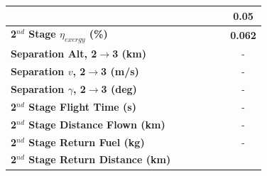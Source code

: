 \begin{table}[ht]
\begin{tabular}{l c c c c c c}
		& \firstsecondSeparationgammamThreeNinety
		& \firstsecondSeparationgammamThreeNinetyFive
		& \firstsecondSeparationgammamThreeStandard
		& \firstsecondSeparationgammamThreeOneHundredFive
		& \firstsecondSeparationgammamThreeOneHundredTen
		&0.05
		\\
		\hline 
		\textbf{2$^{nd}$ Stage $\eta_{exergy}$ (\%)}
		& \textbf{\secondExergyEffmThreeNinety}
		& \textbf{\secondExergyEffmThreeNinetyFive}
		& \textbf{\secondExergyEffmThreeStandard}
		& \textbf{\secondExergyEffmThreeOneHundredFive}
		& \textbf{\secondExergyEffmThreeOneHundredTen}
		& \textbf{0.062}
		\\
		\textbf{Separation Alt, 2$\rightarrow$3 (km)}
		& \secondthirdSeparationAltmThreeNinety
		& \secondthirdSeparationAltmThreeNinetyFive
		& \secondthirdSeparationAltmThreeStandard
		& \secondthirdSeparationAltmThreeOneHundredFive
		& \secondthirdSeparationAltmThreeOneHundredTen
		& -
		\\
		\textbf{Separation $v$, 2$\rightarrow$3 (m/s)}
		& \secondthirdSeparationvmThreeNinety
		& \secondthirdSeparationvmThreeNinetyFive
		& \secondthirdSeparationvmThreeStandard
		& \secondthirdSeparationvmThreeOneHundredFive
		& \secondthirdSeparationvmThreeOneHundredTen
		& -
		\\
		\textbf{Separation $\gamma$, 2$\rightarrow$3 (deg)}
		& \secondthirdSeparationgammamThreeNinety
		& \secondthirdSeparationgammamThreeNinetyFive
		& \secondthirdSeparationgammamThreeStandard
		& \secondthirdSeparationgammamThreeOneHundredFive
		& \secondthirdSeparationgammamThreeOneHundredTen
		& -
		\\
		\textbf{2$^{nd}$ Stage Flight Time (s)}
		& \secondFlightTimemThreeNinety
		& \secondFlightTimemThreeNinetyFive
		& \secondFlightTimemThreeStandard
		& \secondFlightTimemThreeOneHundredFive
		& \secondFlightTimemThreeOneHundredTen
		& -
		\\
		\textbf{2$^{nd}$ Stage Distance Flown (km)}
		& \SecondDistmThreeNinety
		& \SecondDistmThreeNinetyFive
		& \SecondDistmThreeStandard
		& \SecondDistmThreeOneHundredFive
		& \SecondDistmThreeOneHundredTen
		& -
		\\
		\textbf{2$^{nd}$ Stage Return Fuel (kg)}
		& \returnFuelmThreeNinety
		& \returnFuelmThreeNinetyFive
		& \returnFuelmThreeStandard
		& \returnFuelmThreeOneHundredFive
		& \returnFuelmThreeOneHundredTen
		& -
		\\
		\textbf{2$^{nd}$ Stage Return Distance (km)}
		& \returnDistmThreeNinety
		& \returnDistmThreeNinetyFive
		& \returnDistmThreeStandard
		& \returnDistmThreeOneHundredFive

\end{tabular}
\end{table}
